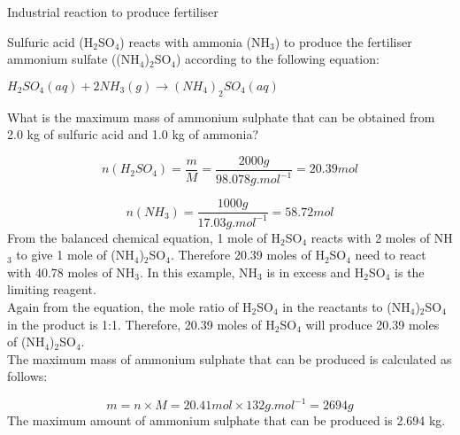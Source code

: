 
\begin{wex}{Industrial reaction to produce fertiliser}{Sulfuric acid (H$_{2}$SO$_{4}$) reacts with ammonia (NH$_{3}$) to produce the fertiliser ammonium sulfate ((NH$_{4}$)$_{2}$SO$_{4}$) according to the following equation:

\begin{center}
\rm${H_{2}SO_{4}(aq) + 2NH_{3}(g) \rightarrow (NH_{4})_{2}SO_{4}(aq)}$
\end{center}

What is the maximum mass of ammonium sulphate that can be obtained from 2.0 kg of sulfuric acid and 1.0 kg of ammonia?
}
{
\begin{equation*}
n(H_{2}SO_{4}) = \frac{m}{M} = \frac{2000 g}{98.078 g.mol^{-1}} = 20.39 mol
\end{equation*}

\begin{equation*}
n(NH_{3}) = \frac{1000 g}{17.03 g.mol^{-1}} = 58.72 mol
\end{equation*}
From the balanced chemical equation, 1 mole of H$_{2}$SO$_{4}$ reacts with 2 moles of NH$_{3}$ to give 1 mole of (NH$_{4}$)$_{2}$SO$_{4}$. Therefore 20.39 moles of H$_{2}$SO$_{4}$ need to react with 40.78 moles of NH$_{3}$. In this example, NH$_{3}$ is in excess and H$_{2}$SO$_{4}$ is the limiting reagent.\\
Again from the equation, the mole ratio of H$_{2}$SO$_{4}$ in the reactants to (NH$_{4}$)$_{2}$SO$_{4}$ in the product is 1:1. Therefore, 20.39 moles of H$_{2}$SO$_{4}$ will produce 20.39 moles of (NH$_{4}$)$_{2}$SO$_{4}$.\\

The maximum mass of ammonium sulphate that can be produced is calculated as follows:

\begin{equation*}
m = n \times M = 20.41 mol \times 132 g.mol^{-1} = 2694 g
\end{equation*}
The maximum amount of ammonium sulphate that can be produced is 2.694 kg.
}
\end{wex}

